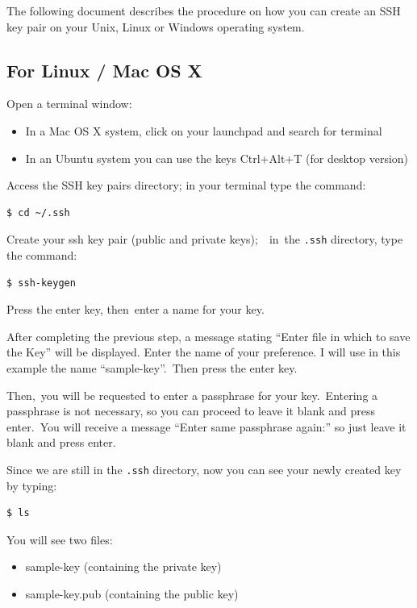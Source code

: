 The following document describes the procedure on how you can create an
SSH key pair on your Unix, Linux or Windows operating system.

\subsection{For Linux / Mac OS X}\label{for-linux-mac-os-x}

Open a terminal window:

\begin{itemize}

\item
  In a Mac OS X system, click on your launchpad and search for terminal
\item
  In an Ubuntu system you can use the keys Ctrl+Alt+T (for desktop
  version)
\end{itemize}

Access the SSH key pairs directory; {i}n your terminal type the command:

\begin{verbatim}
$ cd ~/.ssh
\end{verbatim}

Create your ssh key pair (public and private keys);~~in~the
\texttt{.ssh} directory, type the command:

\begin{verbatim}
$ ssh-keygen
\end{verbatim}

Press the enter key, then~enter a name for your key.

After completing the previous step, a message stating ``Enter file in
which to save the Key'' will be displayed. Enter the name of your
preference. I will use in this example the name ``sample-key''.{~}Then
press the enter key.

{Then,~}you will be requested to enter a passphrase for your
key.~Entering a passphrase is not necessary, so you can proceed to leave
it blank and press enter.{~}You will receive a message ``Enter same
passphrase again:'' so just leave it blank and press enter.

Since we are still in the \texttt{.ssh} directory, now you can see your
newly created key by typing:

\begin{verbatim}
$ ls
\end{verbatim}

You will see two files:

\begin{itemize}

\item
  sample-key (containing the private key)
\item
  sample-key.pub (containing the public key)
\end{itemize}

